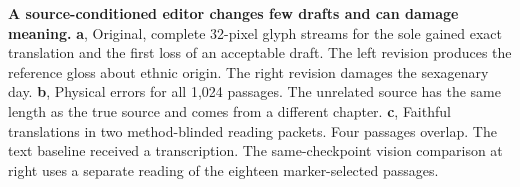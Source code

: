 \textbf{A source-conditioned editor changes few drafts and can damage meaning.} \textbf{a}, Original, complete 32-pixel glyph streams for the sole gained exact translation and the first loss of an acceptable draft. The left revision produces the reference gloss about ethnic origin. The right revision damages the sexagenary day. \textbf{b}, Physical errors for all 1,024 passages. The unrelated source has the same length as the true source and comes from a different chapter. \textbf{c}, Faithful translations in two method-blinded reading packets. Four passages overlap. The text baseline received a transcription. The same-checkpoint vision comparison at right uses a separate reading of the eighteen marker-selected passages.
